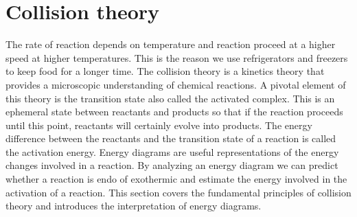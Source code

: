 \documentclass[main.tex]{subfiles}
\begin{document}
\section{Collision theory}
The rate of reaction depends on temperature and reaction proceed at a higher speed at higher temperatures. This is the reason we use refrigerators and freezers to keep food for a longer time. The collision theory is a kinetics theory that provides a microscopic understanding of chemical reactions. A pivotal element of this theory is the transition state also called the activated complex. This is an ephemeral state between reactants and products so that if the reaction proceeds until this point, reactants will certainly evolve into products. The energy difference between the reactants and the transition state of a reaction is called the activation energy. Energy diagrams are useful representations of the energy changes involved in a reaction. By analyzing an energy diagram we can predict whether a reaction is endo of exothermic and estimate the energy involved in the activation of a reaction. This section covers the fundamental principles of collision theory and introduces the interpretation of energy diagrams.
\sloppy 
\end{document}
